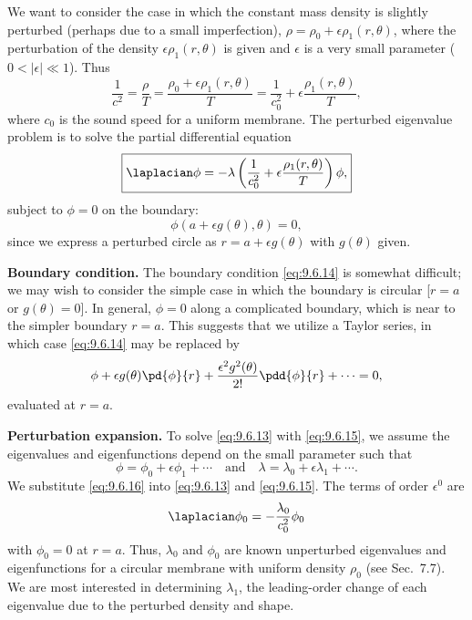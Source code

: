 We want to consider the case in which the constant mass density is slightly perturbed (perhaps due to a small imperfection), $\rho = \rho_0 + \epsilon\rho_1(r,\theta)$, where the perturbation of the density $\epsilon\rho_1(r,\theta)$ is given and $\epsilon$ is a very small parameter ($0 < |\epsilon| \ll 1$).  Thus
\[
\frac{1}{c^2} = \frac{\rho}{T} = \frac{\rho_0+\epsilon\rho_1(r,\theta)}{T} = \frac{1}{c_0^2} + \epsilon\frac{\rho_1(r,\theta)}{T},
\]
where $c_0$ is the sound speed for a uniform membrane.  The perturbed eigenvalue problem is to solve the partial differential equation
\begin{equation}
\label{eq:9.6.13}
\boxed{\laplacian\phi = -\lambda\left(\frac{1}{c_0^2} + \epsilon\frac{\rho_1(r,\theta)}{T}\right)\phi,}
\end{equation}
subject to $\phi = 0$ on the boundary:
\begin{equation}
\label{eq:9.6.14}
\boxed{\phi(a+\epsilon g(\theta),\theta) = 0,}
\end{equation}
since we express a perturbed circle as $r = a + \epsilon g(\theta)$ with $g(\theta)$ given.

\textbf{Boundary condition.}
The boundary condition \eqref{eq:9.6.14} is somewhat difficult; we may wish to consider the simple case in which the boundary is circular [$r = a$ or $g(\theta)=0$].  In general, $\phi = 0$ along a complicated boundary, which is near to the simpler boundary $r = a$.  This suggests that we utilize a Taylor series, in which case \eqref{eq:9.6.14} may be replaced by
\begin{equation}
\label{eq:9.6.15}
\phi + \epsilon g(\theta)\pd{\phi}{r} + \frac{\epsilon^2 g^2(\theta)}{2!}\pdd{\phi}{r} + \cdots = 0,
\end{equation}
evaluated at $r = a$.

\textbf{Perturbation expansion.}
To solve \eqref{eq:9.6.13} with \eqref{eq:9.6.15}, we assume the eigenvalues and eigenfunctions depend on the small parameter such that
\begin{equation}
\label{eq:9.6.16}
\phi = \phi_0 + \epsilon\phi_1 + \cdots \quad\text{and}\quad \lambda = \lambda_0 + \epsilon\lambda_1 + \cdots.
\end{equation}
We substitute \eqref{eq:9.6.16} into \eqref{eq:9.6.13} and \eqref{eq:9.6.15}.  The terms of order $\epsilon^0$ are
\begin{equation}
\label{eq:9.6.17}
\laplacian\phi_0 = -\frac{\lambda_0}{c_0^2}\phi_0
\end{equation}
with $\phi_0 = 0$ at $r = a$.  Thus, $\lambda_0$ and $\phi_0$ are known unperturbed eigenvalues and eigenfunctions for a circular membrane with uniform density $\rho_0$ (see Sec.~7.7).  We are most interested in determining $\lambda_1$, the leading-order change of each eigenvalue due to the perturbed density and shape.

